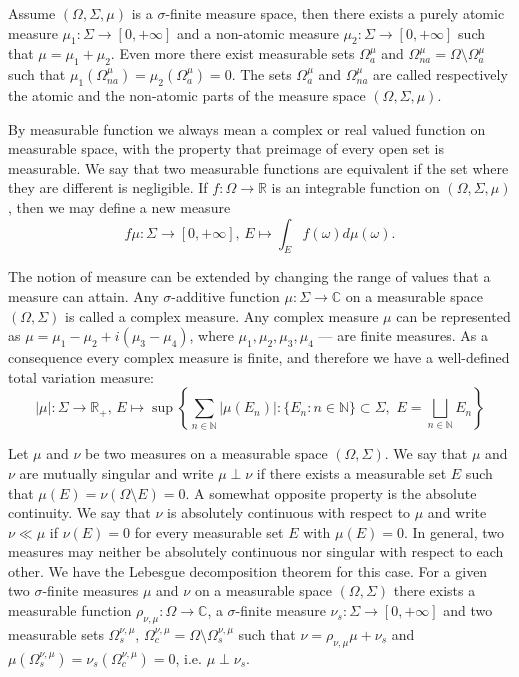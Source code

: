 Assume $(\Omega,\Sigma,\mu)$ is a $\sigma$-finite measure space, then there
exists a purely atomic measure $\mu_1:\Sigma\to[0,+\infty]$ and a non-atomic
measure $\mu_2:\Sigma\to[0,+\infty]$ such that $\mu=\mu_1+\mu_2$. Even more
there exist measurable sets $\Omega_a^{\mu}$ and
$\Omega_{na}^{\mu}=\Omega\setminus \Omega_a^{\mu}$ such that
$\mu_1(\Omega_{na}^{\mu})=\mu_2(\Omega_a^{\mu})=0$. The sets $\Omega_a^{\mu}$
and $\Omega_{na}^{\mu}$ are called respectively the atomic and the non-atomic
parts of the measure space $(\Omega,\Sigma,\mu)$.

By measurable function we always mean a complex or real valued function on
measurable space, with the property that preimage of every open set is
measurable. We say that two measurable functions are equivalent if the set where
they are different is negligible. If $f:\Omega\to\mathbb{R}$ is an  integrable
function on $(\Omega,\Sigma,\mu)$, then we may define a new measure 
$$
f\mu:\Sigma\to[0,+\infty],\,E\mapsto\int_{E}f(\omega)d\mu(\omega).
$$

The notion of measure can be extended by changing the range of values that a
measure can attain. Any $\sigma$-additive function $\mu:\Sigma\to\mathbb{C}$ on
a measurable space $(\Omega,\Sigma)$ is called a complex measure. Any complex
measure $\mu$ can be represented as $\mu=\mu_1-\mu_2+i(\mu_3-\mu_4)$, where
$\mu_1,\mu_2,\mu_3,\mu_4$ --- are finite measures. As a consequence every
complex measure is finite, and therefore we have a well-defined total variation
measure:
$$
|\mu|:\Sigma\to\mathbb{R}_+,\,
E\mapsto\sup\left \{\sum_{n\in\mathbb{N}}|\mu(E_n)|
: \{E_n:n\in\mathbb{N} \}\subset\Sigma,\,\, E=\bigsqcup\limits_{n\in\mathbb{N}} E_n\right \}
$$

Let $\mu$ and $\nu$ be two measures on a measurable space $(\Omega,\Sigma)$. We
say that $\mu$ and $\nu$ are mutually singular and write $\mu\perp\nu$ if there
exists a measurable set $E$ such that $\mu(E)=\nu(\Omega\setminus E)=0$. A somewhat 
opposite property is the absolute continuity. We say that $\nu$ is absolutely
continuous with respect to $\mu$ and write $\nu\ll\mu$ if $\nu(E)=0$ for every
measurable set $E$ with $\mu(E)=0$. In general, two measures may neither be
absolutely continuous nor singular with respect to each other. We have the
Lebesgue decomposition theorem for this case. For a given two $\sigma$-finite
measures $\mu$ and $\nu$ on a measurable space $(\Omega,\Sigma)$ there exists a
measurable function $\rho_{\nu,\mu}:\Omega\to\mathbb{C}$, a $\sigma$-finite
measure $\nu_s:\Sigma\to[0,+\infty]$ and two measurable sets
$\Omega_s^{\nu,\mu}$, $\Omega_c^{\nu,\mu}=\Omega\setminus\Omega_s^{\nu,\mu}$
such that $\nu=\rho_{\nu,\mu}\mu+\nu_s$ and
$\mu(\Omega_s^{\nu,\mu})=\nu_s(\Omega_c^{\nu,\mu})=0$, i.e. $\mu\perp\nu_s$.

